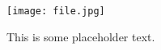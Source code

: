 
\begin{figure}[h]
	\centering
	\texttt{[image: file.jpg]}
	\caption{This is some placeholder text.}
\end{figure}


